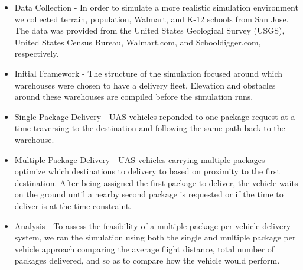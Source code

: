 \justify
\begin{itemize}
\item{Data Collection - In order to simulate a more realistic simulation environment we collected terrain, population, Walmart, and K-12 schools from San Jose. The data was provided from the United States Geological Survey (USGS), United States Census Bureau, Walmart.com, and Schooldigger.com, respectively.}


\item{Initial Framework - The structure of the simulation focused around which warehouses were chosen to have a delivery fleet. Elevation and obstacles around these warehouses are compiled before the simulation runs.}


\item{Single Package Delivery - UAS vehicles reponded to one package request at a time traversing to the destination and following the same path back to the warehouse.}


\item{Multiple Package Delivery - UAS vehicles carrying multiple packages optimize which destinations to delivery to based on proximity to the first destination. After being assigned the first package to deliver, the vehicle waits on the ground until a nearby second package is requested or if the time to deliver is at the time constraint.}


\item{Analysis - To assess the feasibility of a multiple package per vehicle delivery system, we ran the simulation using both the single and multiple package per vehicle approach comparing the average flight distance, total number of packages delivered, and so as to compare how the vehicle would perform.}
\end{itemize}
